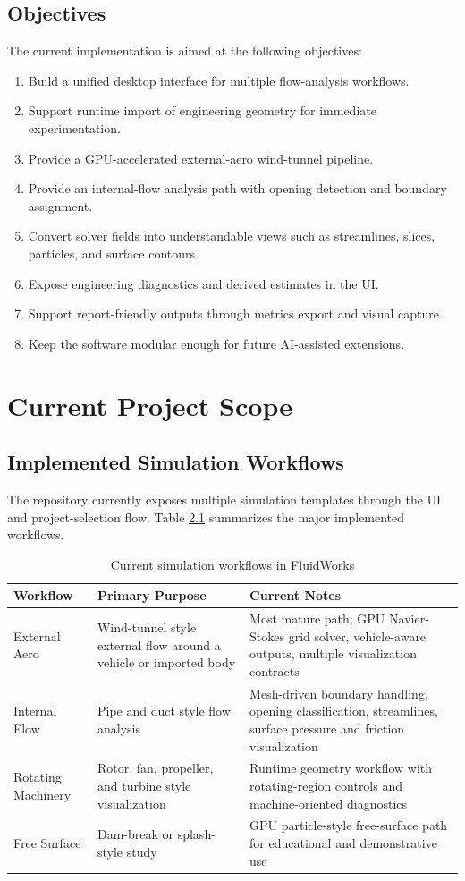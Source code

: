 \documentclass[12pt,a4paper,titlepage]{report}
\begin{document}
\section{Objectives}
The current implementation is aimed at the following objectives:
\begin{enumerate}
\item Build a unified desktop interface for multiple flow-analysis workflows.
\item Support runtime import of engineering geometry for immediate experimentation.
\item Provide a GPU-accelerated external-aero wind-tunnel pipeline.
\item Provide an internal-flow analysis path with opening detection and boundary assignment.
\item Convert solver fields into understandable views such as streamlines, slices, particles, and surface contours.
\item Expose engineering diagnostics and derived estimates in the UI.
\item Support report-friendly outputs through metrics export and visual capture.
\item Keep the software modular enough for future AI-assisted extensions.
\end{enumerate}

\chapter{Current Project Scope}
\section{Implemented Simulation Workflows}
The repository currently exposes multiple simulation templates through the UI and project-selection flow. Table \ref{tab:modes} summarizes the major implemented workflows.

\begin{table}[H]
\centering
\caption{Current simulation workflows in FluidWorks}
\label{tab:modes}
\begin{tabular}{p{3.0cm}p{4.2cm}p{6.3cm}}
\toprule
\textbf{Workflow} & \textbf{Primary Purpose} & \textbf{Current Notes} \\
\midrule
External Aero & Wind-tunnel style external flow around a vehicle or imported body & Most mature path; GPU Navier-Stokes grid solver, vehicle-aware outputs, multiple visualization contracts \\
Internal Flow & Pipe and duct style flow analysis & Mesh-driven boundary handling, opening classification, streamlines, surface pressure and friction visualization \\
Rotating Machinery & Rotor, fan, propeller, and turbine style visualization & Runtime geometry workflow with rotating-region controls and machine-oriented diagnostics \\
Free Surface & Dam-break or splash-style study & GPU particle-style free-surface path for educational and demonstrative use \\
\bottomrule
\end{tabular}
\end{table}
\end{document}
